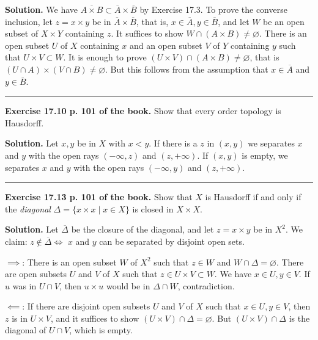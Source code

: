 \documentclass[12pt,letterpaper]{article}
\newcommand{\hs}{\bigskip\hrule\medskip}
\newcommand{\noi}{\noindent}%
\begin{document}
\noi\textbf{Solution.} We have $\overline{A\times B}\subset\overline{A}\times\overline{B}$ by Exercise 17.3. To prove the converse inclusion, let $z=x\times y$ be in $\overline{A}\times\overline{B}$, that is, $x\in\overline{A},y\in\overline{B}$, and let $W$ be an open subset of $X\times Y$ containing $z$. It suffices to show $W\cap(A\times B)\ne\varnothing$. There is an open subset $U$ of $X$ containing $x$ and an open subset $V$ of $Y$ containing $y$ such that $U\times V\subset W$. It is enough to prove $(U\times V)\cap(A\times B)\ne\varnothing$, that is $(U\cap A)\times(V\cap B)\ne\varnothing$. But this follows from the assumption that $x\in\overline{A}$ and $y\in\overline{B}$. 

\hs

\noi\textbf{Exercise 17.10 p. 101 of the book.} Show that every order topology is Hausdorff.

\noi\textbf{Solution.} Let $x,y$ be in $X$ with $x<y$. If there is a $z$ in $(x,y)$ we separates $x$ and $y$ with the open rays $(-\infty,z)$ and $(z,+\infty)$. If $(x,y)$ is empty, we separates $x$ and $y$ with the open rays $(-\infty,y)$ and $(z,+\infty)$. 

\hs 


\noi\textbf{Exercise 17.13 p. 101 of the book.} Show that $X$ is Hausdorff if and only if the \emph{diagonal} $\Delta=\{x\times x\mid x\in X\}$ is closed in $X\times X$. 

\noi\textbf{Solution.} Let $\overline\Delta$ be the closure of the diagonal, and let $z=x\times y$ be in $X^2$. We claim: $z\notin\overline\Delta\iff$ $x$ and $y$ can be separated by disjoint open sets. 

\noi$\implies$: There is an open subset $W$ of $X^2$ such that $z\in W$ and $W\cap\Delta=\varnothing$. There are open subsets $U$ and $V$ of $X$ such that $z\in U\times V\subset W$. We have $x\in U,y\in V$. If $u$ was in $U\cap V$, then $u\times u$ would be in $\Delta\cap W$, contradiction. 

\noi$\impliedby$: If there are disjoint open subsets $U$ and $V$ of $X$ such that $x\in U,y\in V$, then $z$ is in $U\times V$, and it suffices to show $(U\times V)\cap\Delta=\varnothing$. But $(U\times V)\cap\Delta$ is the diagonal of $U\cap V$, which is empty. 
\end{document}
